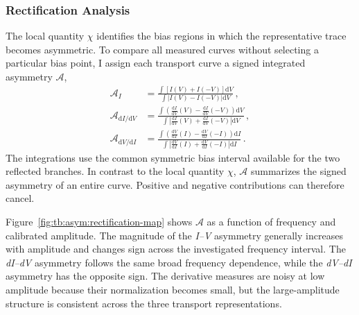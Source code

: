     \subsubsection*{Rectification Analysis}
    \label{subsec:tb:asym:rectification}

        The local quantity $\chi$ identifies the bias regions in which the representative trace becomes asymmetric. To compare all measured curves without selecting a particular bias point, I assign each transport curve a signed integrated asymmetry $\mathcal{A}$,
        \begin{align}
            \mathcal{A}_I &= \frac{\int \left[I(V)+I(-V)\right]\mathrm{d}V}{\int \left|I(V)-I(-V)\right|\mathrm{d}V}\,, \\
            \mathcal{A}_{\mathrm{d}I/\mathrm{d}V} &= \frac{\int \left(\tfrac{\mathrm{d}I}{\mathrm{d}V}(V) - \tfrac{\mathrm{d}I}{\mathrm{d}V}(-V) \right)\mathrm{d}V}{\int \left|\tfrac{\mathrm{d}I}{\mathrm{d}V}(V) + \tfrac{\mathrm{d}I}{\mathrm{d}V}(-V) \right|\mathrm{d}V} \,,\\
            \mathcal{A}_{\mathrm{d}V/\mathrm{d}I} &= \frac{\int \left(\tfrac{\mathrm{d}V}{\mathrm{d}I}(I) - \tfrac{\mathrm{d}V}{\mathrm{d}I}(-I) \right)\mathrm{d}I}{\int \left|\tfrac{\mathrm{d}V}{\mathrm{d}I}(I) + \tfrac{\mathrm{d}V}{\mathrm{d}I}(-I) \right|\mathrm{d}I}\,.
            \label{eq:tb:asym:rect-A}
        \end{align}
        The integrations use the common symmetric bias interval available for the two reflected branches. In contrast to the local quantity $\chi$, $\mathcal{A}$ summarizes the signed asymmetry of an entire curve. Positive and negative contributions can therefore cancel.

        Figure~\ref{fig:tb:asym:rectification-map} shows $\mathcal{A}$ as a function of frequency and calibrated amplitude. The magnitude of the \textit{I--V} asymmetry generally increases with amplitude and changes sign across the investigated frequency interval. The \textit{dI--dV} asymmetry follows the same broad frequency dependence, while the \textit{dV--dI} asymmetry has the opposite sign. The derivative measures are noisy at low amplitude because their normalization becomes small, but the large-amplitude structure is consistent across the three transport representations.

